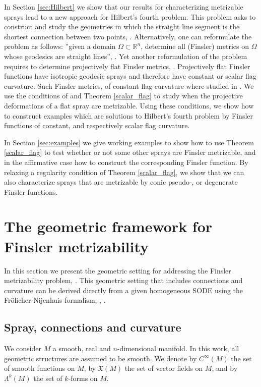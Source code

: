 \documentclass[oneside,english]{amsart}
\numberwithin{equation}{section}
\numberwithin{figure}{section}
\theoremstyle{plain}
\theoremstyle{plain}
\theoremstyle{definition}
\theoremstyle{plain}
\theoremstyle{plain}
\theoremstyle{plain}
\theoremstyle{remark}
\theoremstyle{remark}
\begin{document}
In Section \ref{sec:Hilbert} we show that our results for
characterizing metrizable sprays lead to a new approach for Hilbert's
fourth problem. This problem asks to
construct and study the geometries in which the straight line segment is the
shortest connection between two points, \cite{Alvarez05}. Alternatively, one
can reformulate the problem as follows: ''given a domain $\Omega \subset
\mathbb{R}^n$, determine all (Finsler) metrics on $\Omega$ whose geodesics are
straight lines'', \cite[p.191]{Shen01}. Yet another reformulation of
the problem requires to determine projectively flat Finsler metrics,
\cite{Crampin11}. Projectively flat Finsler functions have
isotropic geodesic sprays and therefore have constant or scalar flag
curvature. Such Finsler metrics, of constant flag curvature
where studied in \cite{Shen03}. We use the conditions of 
\cite[Theorem 4.1]{BM13} and Theorem \ref{scalar_flag} to study when
the projective deformations of a flat spray are metrizable. Using
these conditions, we show how to construct 
examples which are solutions to Hilbert's fourth problem by Finsler functions of
constant, and respectively scalar flag curvature.

In Section \ref{sec:examples} we give working examples to show how to use Theorem
\ref{scalar_flag} to test whether or not some other sprays are
Finsler metrizable, and in the affirmative case how to construct the
corresponding Finsler function. By relaxing a regularity condition
of Theorem \ref{scalar_flag}, we show that we can also characterize
sprays that are metrizable by conic pseudo-, or degenerate Finsler
functions. 


\section{The geometric framework for Finsler metrizability}

In this section we present the geometric setting for addressing the
Finsler metrizability problem, \cite{BM12a, KS85, Muzsnay06, Shen01,
  Szilasi03}. This geometric setting that includes connections and
curvature can be derived directly from a given homogeneous SODE using
the Fr\"olicher-Nijenhuis formalism, \cite[\S 30]{KMS93},
\cite[Chapter 2]{GM00}. 

\subsection{Spray, connections and curvature}

We consider $M$ a smooth, real and $n$-dimensional manifold. In this
work, all geometric structures are assumed to be smooth. We denote by
$C^{\infty}(M)$ the set of smooth functions on $M$, by
$\mathfrak{X}(M)$ the set of vector fields on $M$,
and by $\Lambda^k(M)$ the set of $k$-forms on $M$. 
\end{document}
